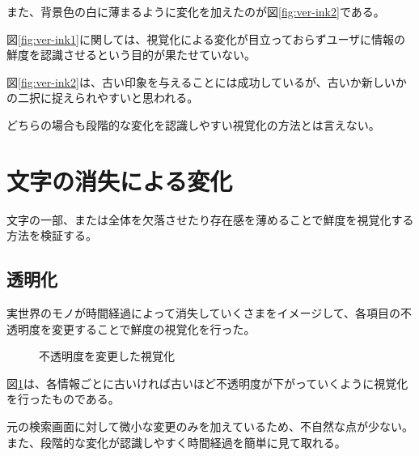 また、背景色の白に薄まるように変化を加えたのが図\ref{fig:ver-ink2}である。

図\ref{fig:ver-ink1}に関しては、視覚化による変化が目立っておらずユーザに情報の鮮度を認識させるという目的が果たせていない。

図\ref{fig:ver-ink2}は、古い印象を与えることには成功しているが、古いか新しいかの二択に捉えられやすいと思われる。

どちらの場合も段階的な変化を認識しやすい視覚化の方法とは言えない。

\section{文字の消失による変化}
\label{sec:ver-character}

文字の一部、または全体を欠落させたり存在感を薄めることで鮮度を視覚化する方法を検証する。

\subsection{透明化}
\label{subsec:ver-chr-trp}

実世界のモノが時間経過によって消失していくさまをイメージして、各項目の不透明度を変更することで鮮度の視覚化を行った。

\begin{figure}[htbp]
  \begin{center}
  \end{center}
  \caption{不透明度を変更した視覚化}
  \label{fig:ver-transparence}
\end{figure}

図\ref{fig:ver-transparence}は、各情報ごとに古いければ古いほど不透明度が下がっていくように視覚化を行ったものである。

元の検索画面に対して微小な変更のみを加えているため、不自然な点が少ない。また、段階的な変化が認識しやすく時間経過を簡単に見て取れる。

